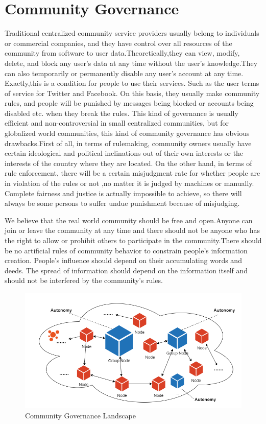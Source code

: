 \documentclass{article}
\begin{document}
\section{Community Governance}
    Traditional centralized community service providers usually belong to individuals or commercial companies, and they have control over all resources of the community from software to user data.Theoretically,they can view, modify, delete, and block any user's data at any time without the user's knowledge.They can also temporarily or permanently disable any user's account at any time. Exactly,this is a condition for people to use their services. Such as the user terms of service for Twitter\cite{twitter_tos} and Facebook\cite{facebook_tos}. On this basis, they usually make community rules, and people will be punished by messages being blocked or accounts being disabled etc. when they break the rules. This kind of governance is usually efficient and non-controversial in small centralized communities, but for globalized world communities, this kind of community governance has obvious drawbacks.First of all, in terms of rulemaking, community owners usually have certain ideological and political inclinations out of their own interests or the interests of the country where they are located. On the other hand, in terms of rule enforcement, there will be a certain misjudgment rate for whether people are in violation of the rules or not ,no matter it is judged by machines or manually. Complete fairness and justice is actually impossible to achieve, so there will always be some persons to suffer undue punishment because of misjudging.

    We believe that the real world community should be free and open.Anyone can join or leave the community at any time and there should not be anyone who has the right to allow or prohibit others to participate in the community.There should be no artificial rules of community behavior to constrain people's information creation. People's influence should depend on their accumulating words and deeds. The spread of information should depend on the information itself and should not be interfered by the community's rules.
    
    \begin{figure}[H]
        \centering
        \includegraphics[width=\textwidth]{figures-governance.png}
        \caption{Community Governance Landscape}
    \end{figure}
\end{document}
